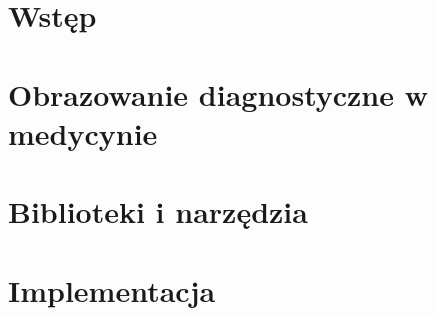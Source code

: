 \chapter{Wstęp}


\chapter{Obrazowanie diagnostyczne w medycynie}


\chapter{Biblioteki i narzędzia}


\chapter{Implementacja}

